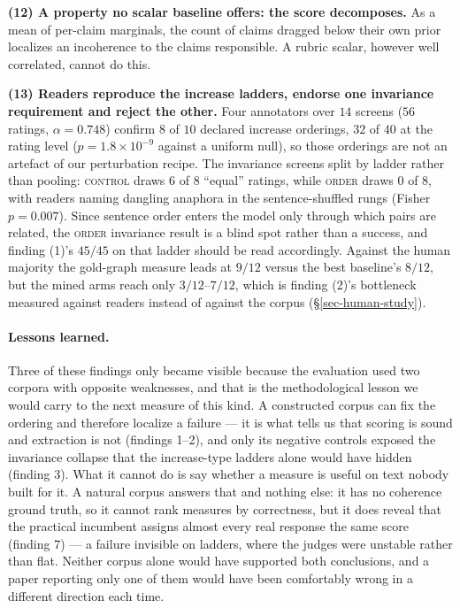 \textbf{(12) A property no scalar baseline offers: the score decomposes.} As a mean of per-claim marginals, the
count of claims dragged below their own prior localizes an incoherence to the claims responsible. A rubric
scalar, however well correlated, cannot do this.

\textbf{(13) Readers reproduce the increase ladders, endorse one invariance requirement and reject the other.}
Four annotators over $14$ screens ($56$ ratings, $\alpha=0.748$) confirm $8$ of $10$ declared increase orderings,
$32$ of $40$ at the rating level ($p=1.8\times10^{-9}$ against a uniform null), so those orderings are not an
artefact of our perturbation recipe. The invariance screens split by ladder rather than pooling: \textsc{control}
draws $6$ of $8$ ``equal'' ratings, while \textsc{order} draws $0$ of $8$, with readers naming dangling anaphora
in the sentence-shuffled rungs (Fisher $p=0.007$). Since sentence order enters the model only through which pairs
are related, the \textsc{order} invariance result is a blind spot rather than a success, and finding (1)'s
$45/45$ on that ladder should be read accordingly. Against the human majority the gold-graph measure leads at
$9/12$ versus the best baseline's $8/12$, but the mined arms reach only $3/12$--$7/12$, which is finding (2)'s
bottleneck measured against readers instead of against the corpus (\S\ref{sec-human-study}).

\paragraph{Lessons learned.} Three of these findings only became visible because the evaluation used two
corpora with opposite weaknesses, and that is the methodological lesson we would carry to the next measure of
this kind. A constructed corpus can fix the ordering and therefore localize a failure --- it is what tells us
that scoring is sound and extraction is not (findings 1--2), and only its negative controls exposed the
invariance collapse that the increase-type ladders alone would have hidden (finding 3). What it cannot do is
say whether a measure is useful on text nobody built for it. A natural corpus answers that and nothing else: it
has no coherence ground truth, so it cannot rank measures by correctness, but it does reveal that the practical
incumbent assigns almost every real response the same score (finding 7) --- a failure invisible on ladders,
where the judges were unstable rather than flat. Neither corpus alone would have supported both conclusions, and
a paper reporting only one of them would have been comfortably wrong in a different direction each time.

